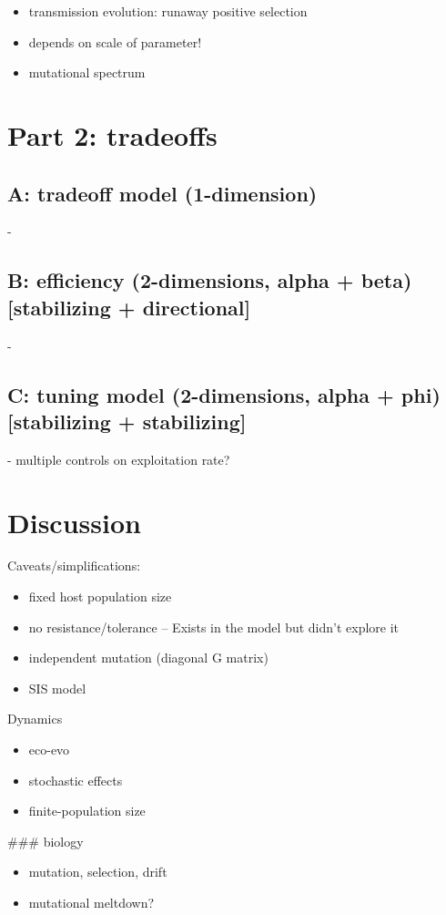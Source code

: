 \begin{itemize}
    \item transmission evolution: runaway positive selection
    \item depends on scale of parameter!
    \item mutational spectrum
\end{itemize}

\section*{Part 2: tradeoffs}

\subsection*{A: tradeoff model (1-dimension)}
    - 
\subsection*{B: efficiency (2-dimensions, alpha + beta) [stabilizing + directional]}
    - 
\subsection*{C: tuning model (2-dimensions, alpha + phi) [stabilizing + stabilizing]}         - multiple controls on exploitation rate?

\section*{Discussion}

Caveats/simplifications:

\begin{itemize}
    \item fixed host population size
    \item no resistance/tolerance
        -- Exists in the model but didn't explore it
    \item independent mutation (diagonal G matrix)
    \item SIS model
\end{itemize}

Dynamics

\begin{itemize}
    \item eco-evo
    \item stochastic effects
    \item finite-population size
\end{itemize}

### biology

\begin{itemize}
    \item mutation, selection, drift
    \item mutational meltdown?
\end{itemize}